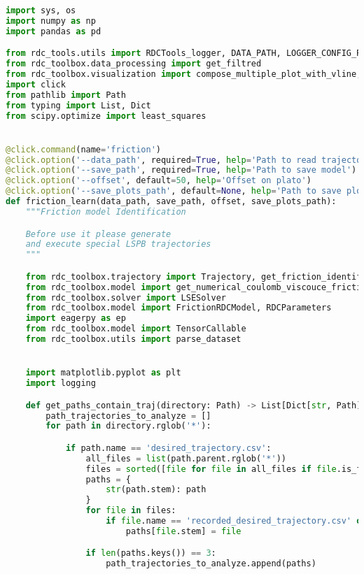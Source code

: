 \begin{lstlisting}[language=python, caption=\raggedright{identification/friction.py}, frame=single]
import sys, os
import numpy as np
import pandas as pd

from rdc_tools.utils import RDCTools_logger, DATA_PATH, LOGGER_CONFIG_PATH, CONFIG_PATH, URDF_PATH, MAIN_PATH
from rdc_toolbox.data_processing import get_filtred
from rdc_toolbox.visualization import compose_multiple_plot_with_vline, compose_two_plot
import click
from pathlib import Path
from typing import List, Dict
from scipy.optimize import least_squares


@click.command(name='friction')
@click.option('--data_path', required=True, help='Path to read trajectories')
@click.option('--save_path', required=True, help='Path to save model')
@click.option('--offset', default=50, help='Offset on plato')
@click.option('--save_plots_path', default=None, help='Path to save plots')
def friction_learn(data_path, save_path, offset, save_plots_path):
    """Friction model Identification

    Before use it please generate
    and execute special LSPB trajectories
    """

    from rdc_toolbox.trajectory import Trajectory, get_friction_identification_trajectories
    from rdc_toolbox.model import get_numerical_coulomb_viscouce_friction_regressor
    from rdc_toolbox.solver import LSESolver
    from rdc_toolbox.model import FrictionRDCModel, RDCParameters
    import eagerpy as ep
    from rdc_toolbox.model import TensorCallable
    from rdc_toolbox.utils import parse_dataset


    import matplotlib.pyplot as plt
    import logging

    def get_paths_contain_traj(directory: Path) -> List[Dict[str, Path]]:
        path_trajectories_to_analyze = []
        for path in directory.rglob('*'):

            if path.name == 'desired_trajectory.csv':
                all_files = list(path.parent.rglob('*')) 
                files = sorted([file for file in all_files if file.is_file()])
                paths = {
                    str(path.stem): path
                }
                for file in files:
                    if file.name == 'recorded_desired_trajectory.csv' or file.name == 'recorded_trajectory.csv':
                        paths[file.stem] = file

                if len(paths.keys()) == 3:
                    path_trajectories_to_analyze.append(paths)


\end{lstlisting}
